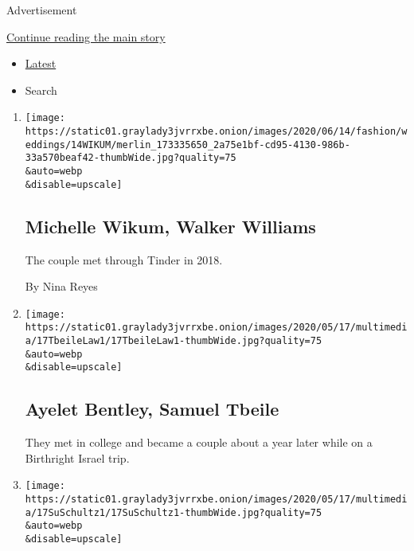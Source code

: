 Advertisement

\protect\hyperlink{after-subheader}{Continue reading the main story}

\begin{itemize}
\tightlist
\item
  \protect\hyperlink{stream-panel}{Latest}
\item
  Search
\end{itemize}

\begin{enumerate}
\def\labelenumi{\arabic{enumi}.}
\item
  \href{/2020/06/14/fashion/weddings/michelle-wikum-walker-williams.html}{}

  \texttt{[image: https://static01.graylady3jvrrxbe.onion/images/2020/06/14/fashion/weddings/14WIKUM/merlin\_173335650\_2a75e1bf-cd95-4130-986b-33a570beaf42-thumbWide.jpg?quality=75\\\&auto=webp\\\&disable=upscale]}

  \hypertarget{michelle-wikum-walker-williams}{%
  \subsection{Michelle Wikum, Walker
  Williams}\label{michelle-wikum-walker-williams}}

  The couple met through Tinder in 2018.

  By Nina Reyes
\item
  \href{/2020/05/17/fashion/weddings/ayelet-bentley-samuel-tbeile.html}{}

  \texttt{[image: https://static01.graylady3jvrrxbe.onion/images/2020/05/17/multimedia/17TbeileLaw1/17TbeileLaw1-thumbWide.jpg?quality=75\\\&auto=webp\\\&disable=upscale]}

  \hypertarget{ayelet-bentley-samuel-tbeile}{%
  \subsection{Ayelet Bentley, Samuel
  Tbeile}\label{ayelet-bentley-samuel-tbeile}}

  They met in college and became a couple about a year later while on a
  Birthright Israel trip.
\item
  \href{/2020/05/17/fashion/weddings/kathy-su-eric-schultz.html}{}

  \texttt{[image: https://static01.graylady3jvrrxbe.onion/images/2020/05/17/multimedia/17SuSchultz1/17SuSchultz1-thumbWide.jpg?quality=75\\\&auto=webp\\\&disable=upscale]}

  \hypertarget{kathy-su-eric-schultz}{%
}
\end{enumerate}
